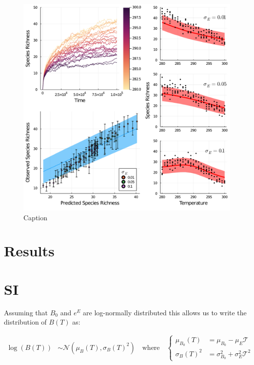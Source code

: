 \documentclass{article}
\begin{document}
\begin{figure}
    \centering
    \includegraphics[width = \textwidth]{docs/Figures/Fig_3.pdf}
    \caption{Caption}
    \label{Fig:Temperature_assembly}
\end{figure}
\section{Results}



\section{SI}

Assuming that $B_0$ and $e^{E}$ are log-normally distributed this allows us to write the distribution of $B(T)$ as:

\begin{align} \label{EQ:Boltz_dist}
    \log(B(T)) &\sim \mathcal{N}(\mu_{B}(T), \sigma_{B}(T)^2) 
    \quad \text{where} \quad 
     \begin{cases}
     \mu_{B_0}(T) &=  \mu_{B_0} - \mu_{E}\mathcal{T} \\
     \sigma_{B}(T)^2 &= \sigma_{B_0}^2 + \sigma_{E}^2 \mathcal{T}^2 
     \end{cases}
\end{align}
\end{document}
